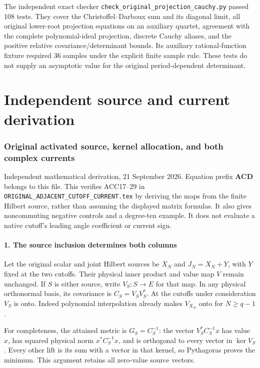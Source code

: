 \documentclass[11pt]{article}
\begin{document}
The independent exact checker \nolinkurl{check_original_projection_cauchy.py} passed 108 tests. They cover the Christoffel--Darboux sum and its diagonal limit, all original lower-root projection equations on an auxiliary quartet, agreement with the complete polynomial-ideal projection, discrete Cauchy aliases, and the positive relative covariance/determinant bounds. Its auxiliary rational-function fixture required 36 samples under the explicit finite sample rule. These tests do not supply an asymptotic value for the original period-dependent determinant.

\clearpage\part{Independent source and current derivation}
\section{Original activated source, kernel allocation, and both complex currents}\label{original-activated-source-kernel-allocation-and-both-complex-currents}

Independent mathematical derivation, 21 September 2026. Equation prefix \textbf{ACD} belongs to this file. This verifies ACC17--29 in \nolinkurl{ORIGINAL_ADJACENT_CUTOFF_CURRENT.tex} by deriving the maps from the finite Hilbert source, rather than assuming the displayed matrix formulas. It also gives noncommuting negative controls and a degree-ten example. It does not evaluate a native cutoff's leading angle coefficient or current sign.

\subsection{1. The source inclusion determines both columns}\label{the-source-inclusion-determines-both-columns}

Let the original scalar and joint Hilbert sources be \(X_N\) and \(J_N=X_N+Y\), with \(Y\) fixed at the two cutoffs. Their physical inner product and value map \(V\) remain unchanged. If \(S\) is either source, write \(V_S:S\to E\) for that map. In any physical orthonormal basis, its covariance is \(C_S=V_SV_S^*\). At the cutoffs under consideration \(V_S\) is onto. Indeed polynomial interpolation already makes \(V_{X_N}\) onto for \(N\ge q-1\).

For completeness, the attained metric is \(G_S=C_S^{-1}\): the vector \(V_S^*C_S^{-1}x\) has value \(x\), has squared physical norm \(x^*C_S^{-1}x\), and is orthogonal to every vector in \(\ker V_S\). Every other lift is its sum with a vector in that kernel, so Pythagoras proves the minimum. This argument retains all zero-value source vectors.
\end{document}
